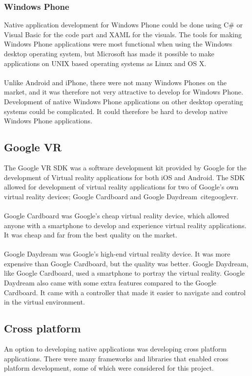 \subsubsection{Windows Phone}
Native application development for Windows Phone could be done using C\# or Visual Basic for the code part and XAML for the visuals. The tools for making Windows Phone applications were most functional when using the Windows desktop operating system, but Microsoft has made it possible to make applications on UNIX based operating systems as Linux and OS X.\\
\\
Unlike Android and iPhone, there were not many Windows Phones on the market, and it was therefore not very attractive to develop for Windows Phone. Development of native Windows Phone applications on other desktop operating systems could be complicated. It could therefore be hard to develop native Windows Phone applications.

\subsection{Google VR}
The Google VR SDK was a software development kit provided by Google for the development of Virtual reality applications for both iOS and Android. The SDK allowed for development of virtual reality applications for two of Google's own virtual reality devices; Google Cardboard and Google Daydream\cite{daydream}\ cite{googlevr}.\\
\\
Google Cardboard was Google's cheap virtual reality device, which allowed anyone with a smartphone to develop and experience virtual reality applications. It was cheap and far from the best quality on the market.\\
\\
Google Daydream was Google's high-end virtual reality device. It was more expensive than Google Cardboard, but the quality was better. Google Daydream, like Google Cardboard, used a smartphone to portray the virtual reality. Google Daydream also came with some extra features compared to the Google Cardboard. It came with a controller that made it easier to navigate and control in the virtual environment. 

\subsection{Cross platform}
An option to developing native applications was developing cross platform applications. There were many frameworks and libraries that enabled cross platform development, some of which were considered for this project.

